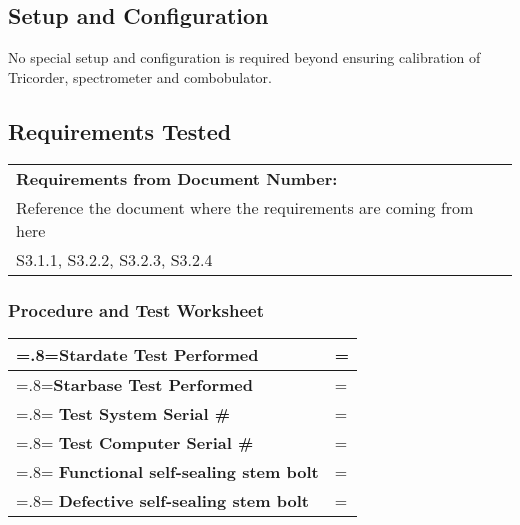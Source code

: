 \documentclass[a4paper,12pt]{article}
\def\arraystretch{1.5}%
\begin{document}
\subsection{Setup and Configuration}

No special setup and configuration is required beyond ensuring calibration of Tricorder, spectrometer and combobulator.

\subsection{Requirements Tested}


\bgroup
\def\arraystretch{1.5}%
\begin{tabularx}{\textwidth}{|X|}
	\hline
	\textbf{Requirements from Document Number:} \\ Reference the document where the requirements are coming from here \\ \hline
	S3.1.1, S3.2.2, S3.2.3, S3.2.4              \\ \hline
\end{tabularx}
\egroup

\subsubsection{Procedure and Test Worksheet}

\bgroup
\def\arraystretch{1.5}%
\begin{tabularx}{\textwidth}{|>{\hsize=.8\hsize\linewidth=\hsize}X|>{\hsize=1.2\hsize\linewidth=\hsize}X|}
	\hline
	\textbf{Stardate Test Performed}           & \\ \hline
	\textbf{Starbase Test Performed}           & \\ \hline
	\textbf{Test System Serial \#}             & \\ \hline
	\textbf{Test Computer Serial \#}           & \\ \hline
	\textbf{Functional self-sealing stem bolt} & \\ \hline
	\textbf{Defective self-sealing stem bolt}  & \\ \hline
\end{tabularx}
\egroup




\bgroup
\end{document}
